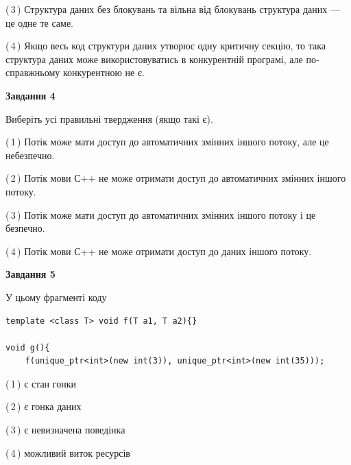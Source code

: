 \documentclass[12pt, ukrainian]{article}
\begin{document}
\begin {large}
{(\,3\,) Структура даних без блокувань та вільна від блокувань структура даних --- це одне те саме.%

(\,4\,) Якщо весь код структури даних утворює одну критичну секцію, то така структура даних може використовуватись в конкурентній програмі, але по-справжньо\-му конкурентною не є.%



\begin{center}
\textbf{Завдання 4}
\end{center}
Виберіть усі правильні твердження (якщо такі є).\par
\vspace{2mm}

(\,1\,) Потік може мати доступ до автоматичних змінних іншого потоку, але це небезпечно.%

(\,2\,) Потік мови С++ не може отримати доступ до автоматичних змінних іншого потоку.%

(\,3\,) Потік може мати доступ до автоматичних змінних іншого потоку і це безпечно.%

(\,4\,) Потік мови С++ не може отримати доступ до даних іншого потоку.%



\begin{center}
\textbf{Завдання 5}
\end{center}
У цьому фрагменті коду
\begin{verbatim}
template <class T> void f(T a1, T a2){}

void g(){
    f(unique_ptr<int>(new int(3)), unique_ptr<int>(new int(35)));
\end{verbatim}

(\,1\,) є стан гонки%

(\,2\,) є гонка даних%

(\,3\,) є невизначена поведінка%

(\,4\,) можливий виток ресурсів%


}
\end {large}
\end{document}
